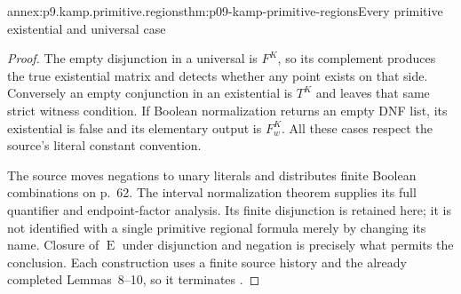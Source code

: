 \begin{annexitem}{annex:p9.kamp.primitive.regions}{thm:p09-kamp-primitive-regions}{Every primitive existential and universal case}
\begin{proof}
The empty disjunction in a universal is \(F^K\), so its
complement produces the true existential matrix and detects whether
any point exists on that side. Conversely an empty conjunction in
an existential is \(T^K\) and leaves that same strict witness
condition. If Boolean normalization returns an empty DNF list,
its existential is false and its elementary output is \(F^K_w\).
All these cases respect the source's literal constant convention.

The source moves negations to unary literals and distributes finite
Boolean combinations on p.~62. The interval normalization theorem
supplies its full quantifier and endpoint-factor analysis. Its finite
disjunction is retained here; it is not identified with a single
primitive regional formula merely by changing its name. Closure of
\(\operatorname{E}\) under disjunction and negation is precisely
what permits the conclusion. Each construction uses a finite source
history and the already completed Lemmas~8--10, so it terminates
\cite[ch.~III, pp.~61--62, 93--94]{Kamp1968}.
\end{proof}
\end{annexitem}

